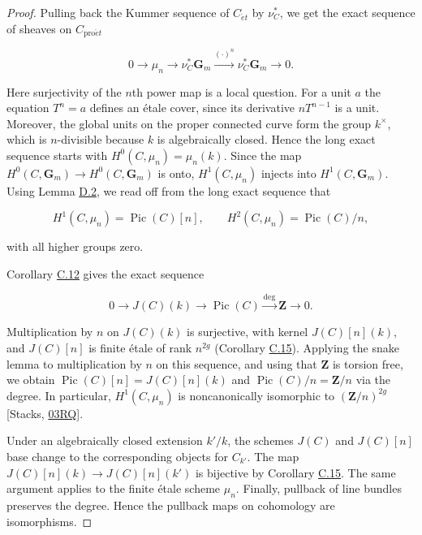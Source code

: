 \documentclass[11pt]{article}
\begin{document}
\begin{proof}[{Proof}]\label{bp182}%
Pulling back the Kummer sequence of \(C_{\acute{e}t}\) by \(\nu_C^*\), we get the exact sequence of sheaves on \(C_{\mathrm{pro}\acute{e}t}\)

\[
0\longrightarrow\mu_n\longrightarrow\nu_C^*\mathbf G_m
\xrightarrow{(\cdot)^n}\nu_C^*\mathbf G_m
\longrightarrow0.
\]

Here surjectivity of the \(n\)th power map is a local question. For a unit \(a\) the equation \(T^n=a\) defines an étale cover, since its derivative \(nT^{n-1}\) is a unit. Moreover, the global units on the proper connected curve form the group \(k^\times\), which is \(n\)-divisible because \(k\) is algebraically closed. Hence the long exact sequence starts with \(H^0(C,\mu_n)=\mu_n(k)\). Since the map \(H^0(C,\mathbf G_m)\to H^0(C,\mathbf G_m)\) is onto, \(H^1(C,\mu_n)\) injects into \(H^1(C,\mathbf G_m)\). Using Lemma \hyperref[bp178]{D.2}, we read off from the long exact sequence that

\[
H^1(C,\mu_n)=\operatorname{Pic}(C)[n],\qquad
H^2(C,\mu_n)=\operatorname{Pic}(C)/n,
\]

with all higher groups zero.

Corollary \hyperref[bp157]{C.12} gives the exact sequence

\[
0\longrightarrow J(C)(k)\longrightarrow\operatorname{Pic}(C)
\xrightarrow{\deg}\mathbf Z\longrightarrow0.
\]

Multiplication by \(n\) on \(J(C)(k)\) is surjective, with kernel \(J(C)[n](k)\), and \(J(C)[n]\) is finite étale of rank \(n^{2g}\) (Corollary \hyperref[bp163]{C.15}).  Applying the snake lemma to multiplication by \(n\) on this sequence, and using that \(\mathbf Z\) is torsion free, we obtain \(\operatorname{Pic}(C)[n]=J(C)[n](k)\) and \(\operatorname{Pic}(C)/n=\mathbf Z/n\) via the degree. In particular, \(H^1(C,\mu_n)\) is noncanonically isomorphic to \((\mathbf Z/n)^{2g}\) [Stacks, \href{https://stacks.math.columbia.edu/tag/03RQ}{03RQ}].

Under an algebraically closed extension \(k'/k\), the schemes \(J(C)\) and \(J(C)[n]\) base change to the corresponding objects for \(C_{k'}\). The map \(J(C)[n](k)\to J(C)[n](k')\) is bijective by Corollary \hyperref[bp163]{C.15}. The same argument applies to the finite étale scheme \(\mu_n\). Finally, pullback of line bundles preserves the degree. Hence the pullback maps on cohomology are isomorphisms.
\end{proof}
\end{document}
